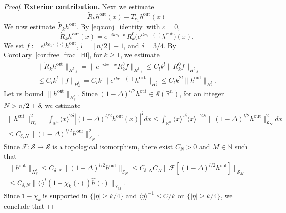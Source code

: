 \documentclass[12pt,a4paper]{amsart}
\numberwithin{equation}{section}
\theoremstyle{plain}
\theoremstyle{definition}
\begin{document}
\begin{proof}
\textbf{Exterior contribution.}
Next we estimate 
\begin{equation*}
    \widetilde{R}_k h^{\mathrm{out}}(x) - T_{e_1} h^{\mathrm{out}}(x)
\end{equation*}
We now estimate $\widetilde{R}_k h^{\mathrm{out}}$.
By \eqref{eq:conj_identity} with $\varepsilon=0$,
\begin{equation*}
    \widetilde{R}_k h^{\mathrm{out}}(x)
=
e^{-ik e_1 \cdot x}\,
R_k^0\!\bigl(e^{ik e_1 \cdot (\cdot)} h^{\mathrm{out}}\bigr)(x).
\end{equation*}
We set $f := e^{ik e_1 \cdot (\cdot)} h^{\mathrm{out}}$, $l=[n/2]+1$, and $\delta=3/4$. By Corollary~\ref{cor:free_frac_Hl}, for $k\geq1$, we estimate
\begin{multline}\label{eq:Rk_out_Hl}
    \|\widetilde{R}_k h^{\mathrm{out}}\|_{H^l_{-\delta}}
    =
    \|e^{-ik e_1 \cdot x} R_k^0 f\|_{H^l_{-\delta}}
    \leq
    C_l k^l \|R_k^0 f\|_{H^l_{-\delta}}
    \\
    \leq
    C_l k^l \|f\|_{H^l_\delta}
    =
    C_l k^l
    \|e^{ik e_1 \cdot (\cdot)} h^{\mathrm{out}}\|_{H^l_\delta}
    \leq
    C_l k^{2l} \|h^{\mathrm{out}}\|_{H^l_\delta}.
\end{multline}
Let us bound $\|h^{\mathrm{out}}\|_{H^l_\delta}$. Since $(1-\Delta)^{l/2} h^{\mathrm{out}} \in \mathscr{S}(\mathbb{R}^n)$, for an integer $N>n/2 + \delta$, we estimate 
\begin{multline*}\label{eq:hout_Hldelta_start}
    \|h^{\mathrm{out}}\|_{H^l_\delta}^2
    =
    \int_{\mathbb{R}^n}
    \langle x \rangle^{2\delta}
    |(1-\Delta)^{l/2} h^{\mathrm{out}}(x)|^2 dx 
    \leq
    \int_{\mathbb{R}^n}
    \langle x \rangle^{2\delta} \langle x \rangle^{-2N}
    \|(1-\Delta)^{l/2} h^{\mathrm{out}}\|_{\mathscr{S}_N}^2 dx\\
    \leq C_{\delta,N} \|(1-\Delta)^{l/2} h^{\mathrm{out}}\|_{\mathscr{S}_N}^2.
\end{multline*}
Since $\mathcal{F}:\mathscr{S}\to\mathscr{S}$ is a topological isomorphism, there exist $C_N>0$ and $M\in \mathbb{N}$ such that 
\begin{multline*}
    \|h^{\mathrm{out}}\|_{H^l_\delta} \leq C_{\delta,N}\|(1-\Delta)^{l/2} h^{\mathrm{out}}\|_{\mathscr{S}_N} \leq C_{\delta,N}C_N \|\mathcal{F}\left[(1-\Delta)^{l/2} h^{\mathrm{out}}\right]\|_{\mathscr{S}_M} \\
    \leq C_{\delta,N} \|\langle\cdot\rangle^l (1-\chi_k(\cdot))\widehat{h}(\cdot)\|_{\mathscr{S}_M}.
\end{multline*}
Since $1 - \chi_k$ is supported in $\{|\eta|\geq k/4\}$ and $\langle\eta\rangle^{-1} \leq C/k$ on $\{|\eta|\geq k/4\}$, we conclude that 

\end{proof}
\end{document}
